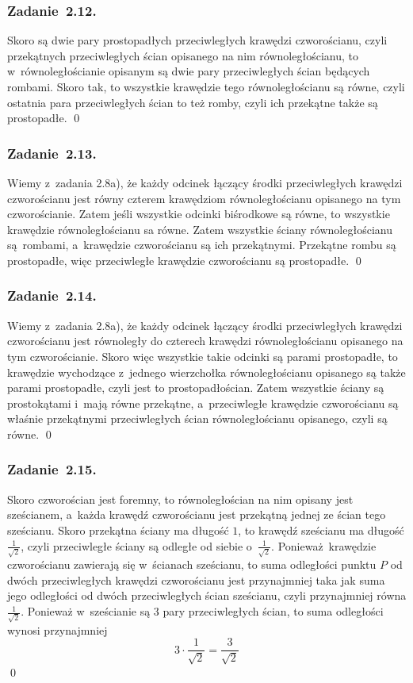 \subsubsection*{Zadanie~2.12.}
Skoro są dwie pary prostopadłych przeciwległych krawędzi czworościanu, czyli przekątnych przeciwległych ścian opisanego na nim równoległościanu, to w~równoległościanie opisanym są dwie pary przeciwległych ścian będących rombami. Skoro tak, to wszystkie krawędzie tego równoległościanu są równe, czyli ostatnia para przeciwległych ścian to też romby, czyli ich przekątne także są prostopadłe.
\qed
\subsubsection*{Zadanie~2.13.}
Wiemy z~zadania 2.8a), że każdy odcinek łączący środki przeciwległych krawędzi czworościanu jest równy czterem krawędziom równoległościanu opisanego na tym czworościanie. Zatem jeśli wszystkie odcinki biśrodkowe są równe, to wszystkie krawędzie równoległościanu sa równe. Zatem wszystkie ściany równoległościanu są rombami, a~krawędzie czworościanu są ich przekątnymi. Przekątne rombu są prostopadłe, więc przeciwległe krawędzie czworościanu są prostopadłe.
\qed
\subsubsection*{Zadanie~2.14.}
Wiemy z~zadania 2.8a), że każdy odcinek łączący środki przeciwległych krawędzi czworościanu jest równoległy do czterech krawędzi równoległościanu opisanego na tym czworościanie. Skoro więc wszystkie takie odcinki są parami prostopadłe, to krawędzie wychodzące z~jednego wierzchołka równoległościanu opisanego są także parami prostopadłe, czyli jest to prostopadłościan. Zatem wszystkie ściany są prostokątami i~mają równe przekątne, a~przeciwległe krawędzie czworościanu są właśnie przekątnymi przeciwległych ścian równoległościanu opisanego, czyli są równe.
\qed
\subsubsection*{Zadanie~2.15.}
Skoro czworościan jest foremny, to równoległościan na nim opisany jest sześcianem, a~każda krawędź czworościanu jest przekątną jednej ze ścian tego sześcianu. Skoro przekątna ściany ma długość \(1\), to krawędź sześcianu ma długość \(\frac{1}{\sqrt{2}}\), czyli przeciwległe ściany są odległe od siebie o~\(\frac{1}{\sqrt{2}}\). Ponieważ krawędzie czworościanu zawierają się w~ścianach sześcianu, to suma odległości punktu \(P\) od dwóch przeciwległych krawędzi czworościanu jest przynajmniej taka jak suma jego odległości od dwóch przeciwległych ścian sześcianu, czyli przynajmniej równa \(\frac{1}{\sqrt{2}}\). Ponieważ w~sześcianie są \(3\) pary przeciwległych ścian, to suma odległości wynosi przynajmniej
\begin{equation*}
    3 \cdot \frac{1}{\sqrt{2}}
    = \frac{3}{\sqrt{2}}
\end{equation*}
\qed
